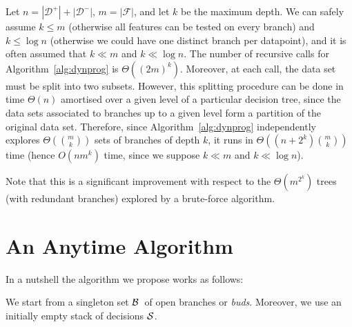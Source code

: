 \documentclass{llncs}
\def\posclass{+}
\def\negclass{-}
\def\datasymb{D}
\newcommand{\setex}[1]{\ensuremath{{\mathcal \datasymb}^{#1}}\xspace}
\newcommand{\posex}{{\setex{\posclass}}\xspace}
\newcommand{\negex}{{\setex{\negclass}}\xspace}
\newcommand{\features}{\ensuremath{{\mathcal F}}\xspace}
\newcommand{\nodes}[0]{\ensuremath{{\cal N}}}
\newcommand{\bud}[0]{\ensuremath{{\cal B}}}
\newcommand{\sequence}[0]{\ensuremath{{\cal S}}}
\newcommand{\maxd}[0]{\ensuremath{k}}
\newcommand{\numex}[0]{\ensuremath{n}}
\newcommand{\numfeat}[0]{\ensuremath{m}}
\newcommand{\mdepth}[0]{\ensuremath{k}}
\begin{document}
	
	Let $\numex = |\posex| + |\negex|$, $\numfeat = |\features|$, and let $\mdepth$ be the maximum depth.
	We can safely assume $\mdepth \leq \numfeat$ (otherwise all features can be tested on every branch) and $\mdepth \leq \log \numex$ (otherwise we could have one distinct branch per datapoint), and it is often assumed that
	 $\mdepth \ll \numfeat$ and $\mdepth \ll \log \numex$. 
	The number of recursive calls for Algorithm~\ref{alg:dynprog} is $\Theta((2\numfeat)^{\mdepth})$. 
	Moreover, at each call, the data set must be split into two subsets. However, this splitting procedure can be done in time $\Theta(\numex)$ amortised over a given level of a particular decision tree, since the data sets associated to branches up to a given level form a partition of the original data set.
	Therefore, since Algorithm~\ref{alg:dynprog} independently explores $\Theta({\numfeat \choose \mdepth})$ sets of branches of depth $\mdepth$, it runs in
	$\Theta((\numex+2^\mdepth){\numfeat \choose \mdepth})$ time (hence $O(\numex\numfeat^\mdepth)$ time, since we suppose $\mdepth \ll \numfeat$ and $\mdepth \ll \log \numex$).
	
	Note that this is a significant improvement with respect to the $\Theta(\numfeat^{2^{\mdepth}})$ trees (with redundant branches) explored by a brute-force algorithm.



\section{An Anytime Algorithm}

In a nutshell the algorithm we propose works as follows:

\medskip

We start from a singleton set \bud\ of open branches or \emph{buds}.
Moreover, we use an initially empty stack of decisions $\sequence$.
\end{document}
